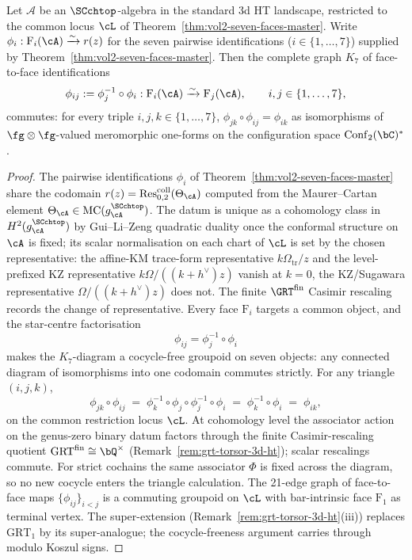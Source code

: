 \begin{proposition}
\label{prop:seven-face-sasaki-commutativity}
Let $\mathcal{A}$ be an $\SCchtop$-algebra in the standard 3d HT
landscape, restricted to the common locus $\cL$ of
Theorem~\ref{thm:vol2-seven-faces-master}. Write
$\phi_i: \mathrm{F}_i(\cA) \xrightarrow{\sim}
r(z)$ for the seven pairwise identifications
\textup{(}$i\in\{1,\dots,7\}$\textup{)} supplied by
Theorem~\ref{thm:vol2-seven-faces-master}. Then the complete graph
$K_7$ of face-to-face identifications
\[
\phi_{ij} := \phi_j^{-1}\circ\phi_i : \mathrm{F}_i(\cA)
\xrightarrow{\sim}\mathrm{F}_j(\cA),
\qquad i,j\in\{1,\dots,7\},
\]
commutes: for every triple $i,j,k\in\{1,\dots,7\}$,
$\phi_{jk}\circ\phi_{ij} = \phi_{ik}$ as isomorphisms of
$\fg\otimes\fg$-valued meromorphic one-forms on the configuration
space $\mathrm{Conf}_2(\bC)^*$.
\end{proposition}

\begin{proof}
The pairwise identifications $\phi_i$ of
Theorem~\ref{thm:vol2-seven-faces-master} share the codomain
$r(z) = \operatorname{Res}^{\mathrm{coll}}_{0,2}(\Theta_\cA)$
computed from the Maurer--Cartan element
$\Theta_\cA\in\mathrm{MC}(g^{\SCchtop}_\cA)$. The datum is unique
as a cohomology class in $H^2(g^{\SCchtop}_\cA)$ by Gui--Li--Zeng
quadratic duality \cite[Thm.~5.2]{GLZ24} once the conformal
structure on $\cA$ is fixed; its scalar normalisation on each
chart of $\cL$ is set by the chosen representative: the
affine-KM trace-form representative $k\Omega_{\mathrm{tr}}/z$ and the
level-prefixed KZ representative $k\Omega/((k+h^\vee)z)$ vanish at
$k=0$, the KZ/Sugawara representative $\Omega/((k+h^\vee)z)$ does
not. The finite $\GRT^{\mathrm{fin}}$ Casimir rescaling records
the change of representative. Every face $\mathrm{F}_i$ targets a
common object, and the star-centre factorisation
\[
\phi_{ij} = \phi_j^{-1}\circ\phi_i
\]
makes the $K_7$-diagram a cocycle-free groupoid on seven objects:
any connected diagram of isomorphisms into one codomain commutes
strictly. For any triangle $(i,j,k)$,
\[
\phi_{jk}\circ\phi_{ij}
\;=\;\phi_k^{-1}\circ\phi_j\circ\phi_j^{-1}\circ\phi_i
\;=\;\phi_k^{-1}\circ\phi_i
\;=\;\phi_{ik},
\]
on the common restriction locus $\cL$. At cohomology level the
associator action on the genus-zero binary datum factors through
the finite Casimir-rescaling quotient
$\mathrm{GRT}^{\mathrm{fin}}\cong\bQ^\times$
(Remark~\ref{rem:grt-torsor-3d-ht}); scalar rescalings commute.
For strict cochains the same associator $\Phi$ is fixed across the
diagram, so no new cocycle enters the triangle calculation. The
21-edge graph of face-to-face maps $\{\phi_{ij}\}_{i<j}$ is a
commuting groupoid on $\cL$ with bar-intrinsic face $\mathrm{F}_1$
as terminal vertex. The super-extension
(Remark~\ref{rem:grt-torsor-3d-ht}(iii)) replaces $\mathrm{GRT}_1$
by its super-analogue; the cocycle-freeness argument carries
through modulo Koszul signs.
\end{proof}

